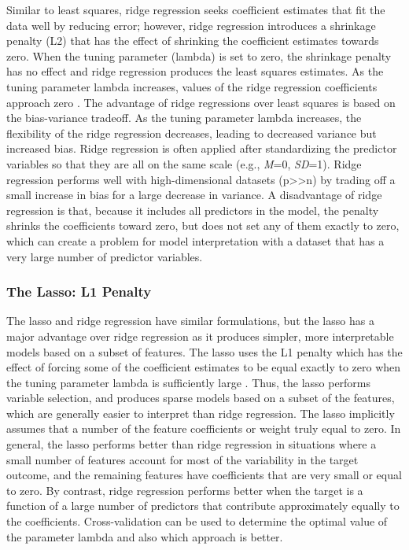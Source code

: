 \documentclass[sigconf]{acmart}
\begin{document}
Similar to least squares, ridge regression seeks coefficient estimates that 
fit the data well by reducing error; however, ridge regression introduces a 
shrinkage penalty (L2) that has the effect of shrinking the coefficient 
estimates towards zero. When the tuning parameter (lambda) is set to zero, 
the shrinkage penalty has no effect and ridge regression produces the least
squares estimates. As the tuning parameter lambda increases, values of the 
ridge regression coefficients approach zero \cite{statlearn13}. The advantage 
of ridge regressions over least squares is based on the bias-variance tradeoff. 
As the tuning parameter lambda increases, the flexibility of the ridge 
regression decreases, leading to decreased variance but increased bias. 
Ridge regression is often applied after standardizing the predictor variables 
so that they are all on the same scale (e.g., \textit{M}=0, \textit{SD}=1). 
Ridge regression performs well with high-dimensional datasets (p>>n) by trading 
off a small increase in bias for a large decrease in variance. A disadvantage
of ridge regression is that, because it includes all predictors in the model, 
the penalty shrinks the coefficients toward zero, but does not set any of them 
exactly to zero, which can create a problem for model interpretation with a 
dataset that has a very large number of predictor variables. 


\subsubsection{The Lasso: L1 Penalty} 

The lasso and ridge regression have similar formulations, but the lasso has 
a major advantage over ridge regression as it produces simpler, more 
interpretable models based on a subset of features. The lasso uses the L1 
penalty which has the effect of forcing some of the coefficient estimates to be
equal exactly to zero when the tuning parameter lambda is sufficiently large 
\cite{statlearn13}. Thus, the lasso performs variable selection, and produces 
sparse models based on a subset of the features, which are generally easier to 
interpret than ridge regression. The lasso implicitly assumes that a number of 
the feature coefficients or weight truly equal to zero. In general, the lasso 
performs better than ridge regression in situations where a small number of 
features account for most of the variability in the target outcome, and the 
remaining features have coefficients that are very small or equal to zero. 
By contrast, ridge regression performs better when the target is a function 
of a large number of predictors that contribute approximately equally to the
coefficients. Cross-validation can be used to determine the optimal value
of the parameter lambda and also which approach is better. 
\end{document}
